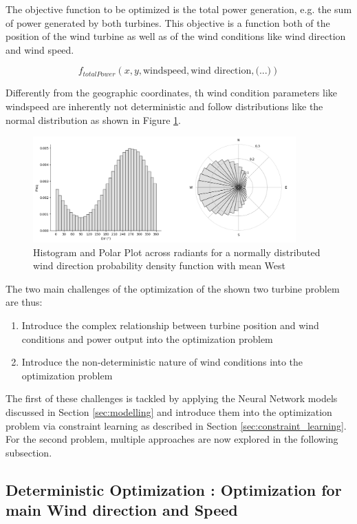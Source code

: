 The objective function to be optimized is the total power generation, e.g. the sum of power generated by both turbines. This objective is a function both of the position of the wind turbine as well as of the wind conditions like wind direction and wind speed. 

$$
f_{total Power}(x,y,\text{windspeed},\text{wind direction}, \text{(...)})
$$

Differently from the geographic coordinates, th wind condition parameters like windspeed are inherently not deterministic and follow distributions like the normal distribution as shown in Figure \ref{fig:wind_dist}.

\begin{figure}[h] 
	\centering
	\includegraphics[width=0.9\textwidth]{figures/optimization/wind_dist.png} %
	\caption{Histogram and Polar Plot across radiants for a normally distributed wind direction probability density function with mean West}
	\label{fig:wind_dist}
\end{figure}

The two main challenges of the optimization of the shown two turbine problem are thus: 

\begin{enumerate}
	\item Introduce the complex relationship between turbine position and wind conditions and power output into the optimization problem
	\item Introduce the non-deterministic nature of wind conditions into the optimization problem
\end{enumerate}

The first of these challenges is tackled by applying the Neural Network models discussed in Section \ref{sec:modelling} and introduce them into the optimization problem via constraint learning as described in Section \ref{sec:constraint_learning}. For the second problem, multiple approaches are now explored in the following subsection.


\subsection{Deterministic Optimization : Optimization for main Wind direction and Speed}


